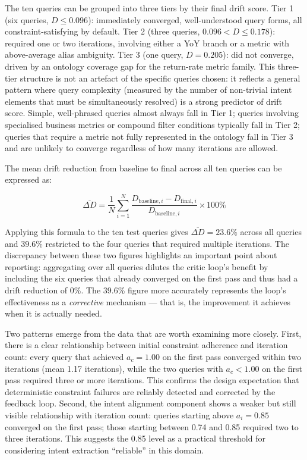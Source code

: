 \documentclass[12pt,a4paper]{report}
\begin{document}
The ten queries can be grouped into three tiers by their final drift score. Tier 1 (six queries, $D \leq 0.096$): immediately converged, well-understood query forms, all constraint-satisfying by default. Tier 2 (three queries, $0.096 < D \leq 0.178$): required one or two iterations, involving either a YoY branch or a metric with above-average alias ambiguity. Tier 3 (one query, $D = 0.205$): did not converge, driven by an ontology coverage gap for the return-rate metric family. This three-tier structure is not an artefact of the specific queries chosen: it reflects a general pattern where query complexity (measured by the number of non-trivial intent elements that must be simultaneously resolved) is a strong predictor of drift score. Simple, well-phrased queries almost always fall in Tier 1; queries involving specialised business metrics or compound filter conditions typically fall in Tier 2; queries that require a metric not fully represented in the ontology fall in Tier 3 and are unlikely to converge regardless of how many iterations are allowed.

The mean drift reduction from baseline to final across all ten queries can be expressed as:

\begin{equation}
  \overline{\Delta D} = \frac{1}{N} \sum_{i=1}^{N} \frac{D_{\text{baseline},i} - D_{\text{final},i}}{D_{\text{baseline},i}} \times 100\%
  \label{eq:mean-reduction}
\end{equation}

Applying this formula to the ten test queries gives $\overline{\Delta D} = 23.6\%$ across all queries and $39.6\%$ restricted to the four queries that required multiple iterations. The discrepancy between these two figures highlights an important point about reporting: aggregating over all queries dilutes the critic loop's benefit by including the six queries that already converged on the first pass and thus had a drift reduction of 0\%. The 39.6\% figure more accurately represents the loop's effectiveness as a \textit{corrective} mechanism — that is, the improvement it achieves when it is actually needed.

Two patterns emerge from the data that are worth examining more closely. First, there is a clear relationship between initial constraint adherence and iteration count: every query that achieved $a_c = 1.00$ on the first pass converged within two iterations (mean 1.17 iterations), while the two queries with $a_c < 1.00$ on the first pass required three or more iterations. This confirms the design expectation that deterministic constraint failures are reliably detected and corrected by the feedback loop. Second, the intent alignment component shows a weaker but still visible relationship with iteration count: queries starting above $a_i = 0.85$ converged on the first pass; those starting between 0.74 and 0.85 required two to three iterations. This suggests the 0.85 level as a practical threshold for considering intent extraction ``reliable'' in this domain.
\end{document}
